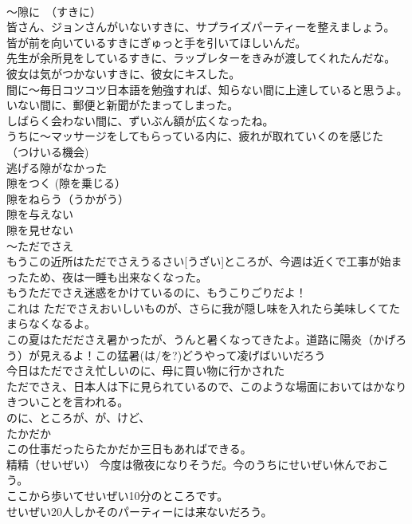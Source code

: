 \documentclass[8pt]{extreport}
\begin{document}
\begin{CJK}{UTF8}{min}
\\	～隙に　（すきに）	
\\	皆さん、ジョンさんがいないすきに、サプライズパーティーを整えましょう。 
\\	皆が前を向いているすきにぎゅっと手を引いてほしいんだ。 
\\	先生が余所見をしているすきに、ラッブレターをきみが渡してくれたんだな。 
\\	彼女は気がつかないすきに、彼女にキスした。 
\\	間に～毎日コツコツ日本語を勉強すれば、知らない間に上達していると思うよ。
\\	いない間に、郵便と新聞がたまってしまった。
\\	しばらく会わない間に、ずいぶん額が広くなったね。
\\	うちに～マッサージをしてもらっている内に、疲れが取れていくのを感じた　
\\	（つけいる機会) 
\\	逃げる隙がなかった 
\\	隙をつく (隙を乗じる）　
\\	隙をねらう（うかがう） 
\\	隙を与えない 
\\	隙を見せない
\\	～ただでさえ 
\\	もうこの近所はただでさえうるさい[うざい]ところが、今週は近くで工事が始まったため、夜は一睡も出来なくなった。 
\\	もうただでさえ迷惑をかけているのに、もうこりごりだよ！ 
\\	これは ただでさえおいしいものが、さらに我が隠し味を入れたら美味しくてたまらなくなるよ。 
\\	この夏はただださえ暑かったが、うんと暑くなってきたよ。道路に陽炎（かげろう）が見えるよ！この猛暑(は/を?)どうやって凌げばいいだろう
\\	今日はただでさえ忙しいのに、母に買い物に行かされた 
\\	ただでさえ、日本人は下に見られているので、このような場面においてはかなりきついことを言われる。 
\\	のに、ところが、が、けど、
\\	たかだか	
\\	この仕事だったらたかだか三日もあればできる。 
\\	精精（せいぜい） 今度は徹夜になりそうだ。今のうちにせいぜい休んでおこう。 
\\	ここから歩いてせいぜい10分のところです。 
\\	せいぜい20人しかそのパーティーには来ないだろう。 

\end{CJK}
\end{document}
